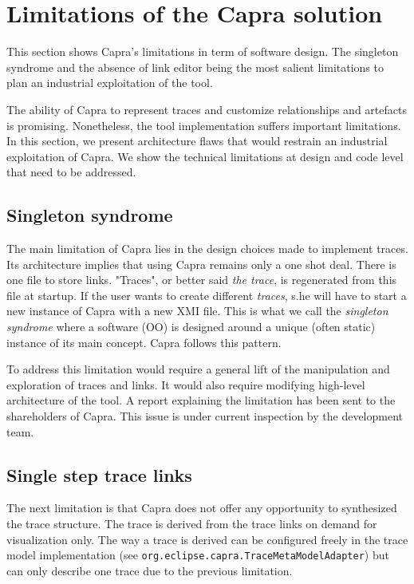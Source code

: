 \section{Limitations of the Capra solution}\label{sec:limitations}

This section shows Capra's limitations in term of software design. The singleton syndrome and the absence of link editor being the most salient limitations to plan an industrial exploitation of the tool.
\sideboxend

The ability of Capra to represent traces and customize relationships and artefacts is promising. Nonetheless, the tool implementation suffers important limitations. In this section, we present architecture flaws that would restrain an industrial exploitation of Capra.  We show the technical limitations at design and code level that need to be addressed.

\subsection{Singleton syndrome}
The main limitation of Capra lies in the design choices made to implement traces. Its architecture implies that using Capra remains only a one shot deal. There is one file to store links. "Traces", or better said \textit{the trace}, is regenerated from this file at startup. If the user wants to create different \textit{traces}, s.he will have to start a new instance of Capra with a new XMI file.
This is what we call the \textit{singleton syndrome} where a software (OO) is designed around a unique (often static) instance of its main concept. Capra follows this pattern.

To address this limitation would require a general lift of the manipulation and exploration of traces and links. It would also require modifying high-level architecture of the tool. A report explaining the limitation has been sent to the shareholders of Capra. This issue is under current inspection by the development team. 

\subsection{Single step trace links}
The next limitation is that Capra does not offer any opportunity to synthesized the trace structure. The trace is derived from the trace links on demand for visualization only. 
The way a trace is derived can be configured freely in the trace model implementation (see \verb|org.eclipse.capra.TraceMetaModelAdapter|) but can only describe one trace due to the previous limitation.

